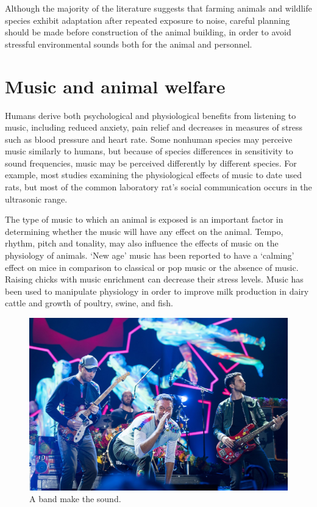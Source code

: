 \documentclass[]{book}
\begin{document}
Although the majority of the literature suggests that farming animals
and wildlife species exhibit adaptation after repeated exposure to
noise, careful planning should be made before construction of the animal
building, in order to avoid stressful environmental sounds both for the
animal and personnel.

\section{Music and animal welfare}\label{music-and-animal-welfare}

Humans derive both psychological and physiological benefits from
listening to music, including reduced anxiety, pain relief and decreases
in measures of stress such as blood pressure and heart rate. Some
nonhuman species may perceive music similarly to humans, but because of
species differences in sensitivity to sound frequencies, music may be
perceived differently by different species. For example, most studies
examining the physiological effects of music to date used rats, but most
of the common laboratory rat's social communication occurs in the
ultrasonic range.

The type of music to which an animal is exposed is an important factor
in determining whether the music will have any effect on the animal.
Tempo, rhythm, pitch and tonality, may also influence the effects of
music on the physiology of animals. `New age' music has been reported to
have a `calming' effect on mice in comparison to classical or pop music
or the absence of music. Raising chicks with music enrichment can
decrease their stress levels. Music has been used to manipulate
physiology in order to improve milk production in dairy cattle and
growth of poultry, swine, and fish.

\begin{figure}

{\centering \includegraphics[width=1\linewidth]{figures/coldplay} 

}

\caption{A band make the sound.}\label{fig:coldplay}
\end{figure}
\end{document}
